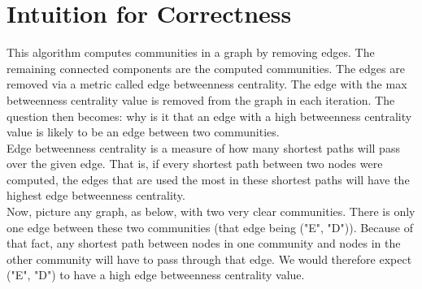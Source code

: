 \documentclass{article}
\begin{document}
\section{Intuition for Correctness}

This algorithm computes communities in a graph by removing edges.  The remaining connected components are the computed communities.  The edges are removed via a metric called edge betweenness centrality.  The edge with the max betweenness centrality value is removed from the graph in each iteration.  The question then becomes: why is it that an edge with a high betweenness centrality value is likely to be an edge between two communities. \\

Edge betweenness centrality is a measure of how many shortest paths will pass over the given edge.  That is, if every shortest path between two nodes were computed, the edges that are used the most in these shortest paths will have the highest edge betweenness centrality. \\

Now, picture any graph, as below, with two very clear communities.  There is only one edge between these two communities (that edge being ("E", "D")).  Because of that fact, any shortest path between nodes in one community and nodes in the other community will have to pass through that edge.  We would therefore expect ("E", "D") to have a high edge betweenness centrality value. \\

\begin{center}
\end{center}
\end{document}
